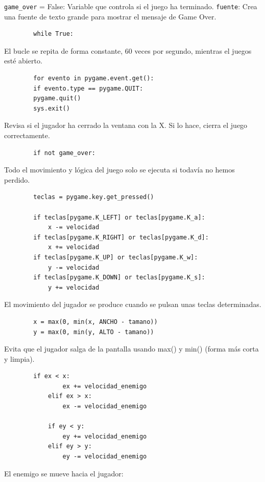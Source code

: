 \documentclass[11.5pt]{article}
\begin{document}
	\verb|game_over| = False: Variable que controla si el juego ha terminado.
	\verb|fuente|: Crea una fuente de texto grande para mostrar el mensaje de Game Over.
	
	\begin{verbatim}
		while True:
	\end{verbatim}
	
	El bucle se repita de forma constante, 60 veces por segundo, mientras el juegos esté abierto.
	
	\begin{verbatim}
		for evento in pygame.event.get():
		if evento.type == pygame.QUIT:
		pygame.quit()
		sys.exit()
	\end{verbatim}
	
	Revisa si el jugador ha cerrado la ventana con la X. Si lo hace, cierra el juego correctamente.
	
	\begin{verbatim}
		if not game_over:
	\end{verbatim}
	
	Todo el movimiento y lógica del juego solo se ejecuta si todavía no hemos perdido.
	
	\begin{verbatim}
		teclas = pygame.key.get_pressed()
		
		if teclas[pygame.K_LEFT] or teclas[pygame.K_a]:
			x -= velocidad
		if teclas[pygame.K_RIGHT] or teclas[pygame.K_d]:
			x += velocidad
		if teclas[pygame.K_UP] or teclas[pygame.K_w]:
			y -= velocidad
		if teclas[pygame.K_DOWN] or teclas[pygame.K_s]:
			y += velocidad
	\end{verbatim}
	
	El movimiento del jugador se produce cuando se pulsan unas teclas determinadas.
	
	\begin{verbatim}
		x = max(0, min(x, ANCHO - tamano))
		y = max(0, min(y, ALTO - tamano))
	\end{verbatim}
	
	Evita que el jugador salga de la pantalla usando max() y min() (forma más corta y limpia).
	
	\begin{verbatim}
		if ex < x:
				ex += velocidad_enemigo
			elif ex > x:
				ex -= velocidad_enemigo
		
			if ey < y:
				ey += velocidad_enemigo
			elif ey > y:
				ey -= velocidad_enemigo
	\end{verbatim}
	
	El enemigo se mueve hacia el jugador:
	
\end{document}
